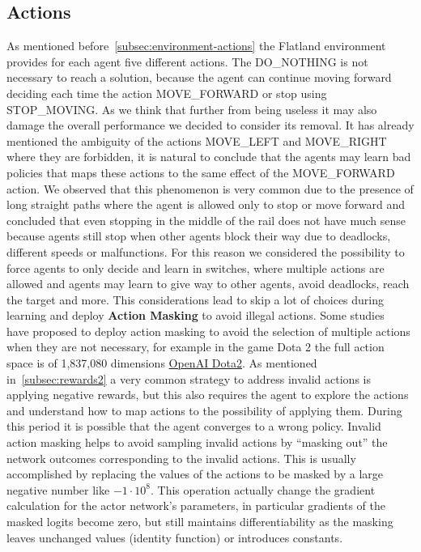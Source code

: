 \documentclass[11pt, a4paper, hidelinks]{report}
\begin{document}
\subsection{Actions}\label{subsec:actions}
As mentioned before~\ref{subsec:environment-actions} the Flatland environment provides for each agent five different actions.
The DO\_NOTHING is not necessary to reach a solution, because the agent can continue moving forward deciding each time the action MOVE\_FORWARD or stop using STOP\_MOVING\@.
As we think that further from being useless it may also damage the overall performance we decided to consider its removal.
It has already mentioned the ambiguity of the actions MOVE\_LEFT and MOVE\_RIGHT where they are forbidden, it is natural to conclude that the agents may learn bad policies that maps these actions to the same effect of the MOVE\_FORWARD action.
We observed that this phenomenon is very common due to the presence of long straight paths where the agent is allowed only to stop or move forward and concluded that even stopping in the middle of the rail does not have much sense because agents still stop when other agents block their way due to deadlocks, different speeds or malfunctions.
For this reason we considered the possibility to force agents to only decide and learn in switches, where multiple actions are allowed and agents may learn to give way to other agents, avoid deadlocks, reach the target and more.
This considerations lead to skip a lot of choices during learning and deploy \textbf{Action Masking} to avoid illegal actions.
Some studies~\citep{ppo-action-masking} have proposed to deploy action masking to avoid the selection of multiple actions when they are not necessary, for example in the game Dota 2 the full action space is of 1,837,080 dimensions \href{https://cdn.openai.com/dota-2.pdf}{OpenAI Dota2}.
As mentioned in~\ref{subsec:rewards2} a very common strategy to address invalid actions is applying negative rewards, but this also requires the agent to explore the actions and understand how to map actions to the possibility of applying them.
During this period it is possible that the agent converges to a wrong policy.
Invalid action masking helps to avoid sampling invalid actions by ``masking out'' the network outcomes corresponding to the invalid actions.
This is usually accomplished by replacing the values of the actions to be masked by a large negative number like $-1 \cdot 10^8$.
This operation actually change the gradient calculation for the actor network's parameters, in particular gradients of the masked logits become zero, but still maintains differentiability as the masking leaves unchanged values (identity function) or introduces constants.
\end{document}
